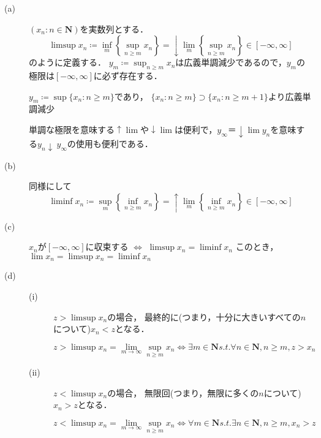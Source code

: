 \documentclass{jsarticle}
\begin{document}
\begin{description}
    \item[(a)] $(x_n : n\in\mathbf{N})$を実数列とする．
        \begin{equation}
            \limsup x_n \coloneqq \inf_m\left\{ \sup_{n\geq m}x_n \right\} = \downarrow\lim_m\left\{ \sup_{n\geq m}x_n \right\} \in [-\infty,\infty]
        \end{equation}
        のように定義する．
        $y_m\coloneqq \sup_{n\geq m}x_n$は広義単調減少であるので，$y_m$の極限は$[-\infty,\infty]$に必ず存在する．

        \begin{itembox}{}
            $y_m \coloneqq \sup\{x_n:n\geq m\}$であり，
            $\{x_n:n\geq m\} \supset \{x_n:n\geq m+1\}$より広義単調減少
        \end{itembox}
        
        単調な極限を意味する$\uparrow\lim$や$\downarrow\lim$は便利で，$y_{\infty}＝\downarrow\lim y_n$を意味する$y_n \downarrow\ y_{\infty}$の使用も便利である．
    \item[(b)] 同様にして
        \begin{equation}
            \liminf x_n \coloneqq \sup_m\left\{ \inf_{n\geq m}x_n \right\} = \uparrow\lim_m\left\{ \inf_{n\geq m}x_n \right\} \in [-\infty,\infty]
        \end{equation}
    \item[(c)] 
        $x_n$が$[-\infty,\infty]$に収束する $\Longleftrightarrow$ $\limsup x_n=\liminf x_n$
        このとき，$\lim x_n=\limsup x_n=\liminf x_n$
    \item[(d)] \mbox{}
        \begin{description}
            \item[(i)] $z > \limsup x_n$の場合，
                最終的に(つまり，十分に大きいすべての$n$について)$x_n<z$となる．
                \begin{itembox}{}
                    \begin{equation}
                        z>\limsup x_n=\lim_{m\to\infty}\sup_{n\geq m}x_n \Longleftrightarrow \exists m\in\mathbf{N} s.t.\forall n\in\mathbf{N},n\geq m, z>x_n \nonumber
                    \end{equation}
                \end{itembox}
            \item[(ii)] $z < \limsup x_n$の場合，
                無限回(つまり，無限に多くの$n$について)$x_n>z$となる．
                \begin{itembox}{}
                    \begin{equation}
                        z<\limsup x_n=\lim_{m\to\infty}\sup_{n\geq m}x_n \Longleftrightarrow \forall m\in\mathbf{N} s.t.\exists n\in\mathbf{N},n\geq m, x_n>z \nonumber
                    \end{equation}
                \end{itembox}
        \end{description}
\end{description}
\end{document}
